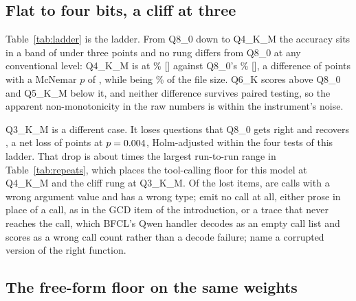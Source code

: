 \documentclass[12pt,letterpaper]{article}
\newcommand{\bfcl}{BFCL}
\newcommand{\qm}{Qwen3-1.7B}
\begin{document}
\subsection{Flat to four bits, a cliff at three}
\label{sec:ladder}

Table~\ref{tab:ladder} is the ladder. From Q8\_0 down to Q4\_K\_M the accuracy sits in a band of under three points and no rung differs from Q8\_0 at any conventional level: Q4\_K\_M is at \qtAccFour{}\% [\qtCiFour{}] against Q8\_0's \qtAccEight{}\% [\qtCiEight{}], a difference of \qtDeltaFour{} points \qtDiffCiFour{} with a McNemar $p$ of \qtPFour{}, while being \qtSizeRatioFour{}\% of the file size. Q6\_K scores above Q8\_0 and Q5\_K\_M below it, and neither difference survives paired testing, so the apparent non-monotonicity in the raw numbers is within the instrument's noise.

Q3\_K\_M is a different case. It loses \qtLostThree{} questions that Q8\_0 gets right and recovers \qtGainedThree{}, a net loss of \qtDropThree{} points \qtDiffCiThree{} at $p=0.004{}$, Holm-adjusted \qtPHolmThree{} within the four tests of this ladder. That drop is about \qtCliffOverNoise{} times the largest run-to-run range in Table~\ref{tab:repeats}, which places the tool-calling floor for this model at Q4\_K\_M and the cliff rung at Q3\_K\_M. Of the \qtLostThree{} lost items, \qtLostThreeValue{} are calls with a wrong argument value and \qtLostThreeType{} has a wrong type; \qtLostThreeNoCall{} emit no call at all, either prose in place of a call, as in the GCD item of the introduction, or a trace that never reaches the call, which \bfcl{}'s Qwen handler decodes as an empty call list and scores as a wrong call count rather than a decode failure; \qtLostThreeName{} name a corrupted version of the right function.

\begin{table}[t]
\centering\footnotesize\setlength{\tabcolsep}{4pt}

\caption{The quantization ladder for \qm{} on \texttt{simple\_python}, $n=\qtN{}$ per rung, all rungs from one FP16 source, one run per rung. Brackets after an accuracy are Wilson 95\% intervals. Lost and gained count questions that flip against Q8\_0; $p$ is McNemar's exact test on those discordant pairs, followed by the Holm-adjusted $p$ within this ladder's four tests, in bold where the adjusted value is below 0.05.}
\label{tab:ladder}
\end{table}

\subsection{The free-form floor on the same weights}
\label{sec:freeform}
\end{document}
